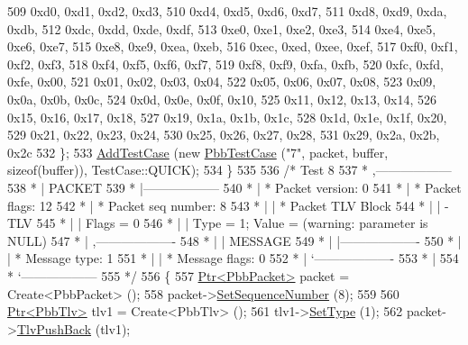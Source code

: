 \begin{DoxyCode}
509       0xd0, 0xd1, 0xd2, 0xd3,
510       0xd4, 0xd5, 0xd6, 0xd7,
511       0xd8, 0xd9, 0xda, 0xdb,
512       0xdc, 0xdd, 0xde, 0xdf,
513       0xe0, 0xe1, 0xe2, 0xe3,
514       0xe4, 0xe5, 0xe6, 0xe7,
515       0xe8, 0xe9, 0xea, 0xeb,
516       0xec, 0xed, 0xee, 0xef,
517       0xf0, 0xf1, 0xf2, 0xf3,
518       0xf4, 0xf5, 0xf6, 0xf7,
519       0xf8, 0xf9, 0xfa, 0xfb,
520       0xfc, 0xfd, 0xfe, 0x00,
521       0x01, 0x02, 0x03, 0x04,
522       0x05, 0x06, 0x07, 0x08,
523       0x09, 0x0a, 0x0b, 0x0c,
524       0x0d, 0x0e, 0x0f, 0x10,
525       0x11, 0x12, 0x13, 0x14,
526       0x15, 0x16, 0x17, 0x18,
527       0x19, 0x1a, 0x1b, 0x1c,
528       0x1d, 0x1e, 0x1f, 0x20,
529       0x21, 0x22, 0x23, 0x24,
530       0x25, 0x26, 0x27, 0x28,
531       0x29, 0x2a, 0x2b, 0x2c
532     \};
533     \hyperlink{classns3_1_1TestCase_a3718088e3eefd5d6454569d2e0ddd835}{AddTestCase} (\textcolor{keyword}{new} \hyperlink{classPbbTestCase}{PbbTestCase} (\textcolor{stringliteral}{"7"}, packet, buffer, \textcolor{keyword}{sizeof}(buffer)), 
      TestCase::QUICK);
534   \}
535 
536   \textcolor{comment}{/* Test 8}
537 \textcolor{comment}{         * ,------------------}
538 \textcolor{comment}{         * |  PACKET}
539 \textcolor{comment}{         * |------------------}
540 \textcolor{comment}{         * | * Packet version:    0}
541 \textcolor{comment}{         * | * Packet flags:  12}
542 \textcolor{comment}{         * | * Packet seq number: 8}
543 \textcolor{comment}{         * |    | * Packet TLV Block}
544 \textcolor{comment}{         * |    |     - TLV}
545 \textcolor{comment}{         * |    |         Flags = 0}
546 \textcolor{comment}{         * |    |         Type = 1; Value = (warning: parameter is NULL)}
547 \textcolor{comment}{         * |    ,-------------------}
548 \textcolor{comment}{         * |    |  MESSAGE}
549 \textcolor{comment}{         * |    |-------------------}
550 \textcolor{comment}{         * |    | * Message type:       1}
551 \textcolor{comment}{         * |    | * Message flags:  0}
552 \textcolor{comment}{         * |    `-------------------}
553 \textcolor{comment}{         * |}
554 \textcolor{comment}{         * `------------------}
555 \textcolor{comment}{  */}
556   \{
557     \hyperlink{classns3_1_1Ptr}{Ptr<PbbPacket>} packet = Create<PbbPacket> ();
558     packet->\hyperlink{classns3_1_1PbbPacket_a7d6a1602be86109760d0f26ff9bbbb8e}{SetSequenceNumber} (8);
559 
560     \hyperlink{classns3_1_1Ptr}{Ptr<PbbTlv>} tlv1 = Create<PbbTlv> ();
561     tlv1->\hyperlink{classns3_1_1PbbTlv_a90a0452018ed364ac37c3ad116dd718b}{SetType} (1);
562     packet->\hyperlink{classns3_1_1PbbPacket_a34935793e729a106c176db99c969cb42}{TlvPushBack} (tlv1);

\end{DoxyCode}
